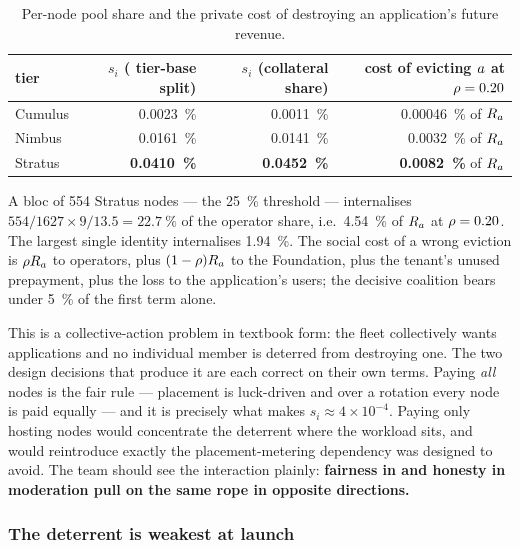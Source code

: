 \begin{table}[H]
\centering
\small
\begin{tabular}{@{}lrrr@{}}
\toprule
tier & $s_i$ (\PNR{} tier-base split) & $s_i$ (collateral share) & cost of evicting $a$ at $\rho = 0.20$ \\
\midrule
Cumulus & \SI{0.0023}{\percent} & \SI{0.0011}{\percent} & \SI{0.00046}{\percent} of $R_{a}$ \\
Nimbus  & \SI{0.0161}{\percent} & \SI{0.0141}{\percent} & \SI{0.0032}{\percent} of $R_{a}$ \\
Stratus & \textbf{\SI{0.0410}{\percent}} & \textbf{\SI{0.0452}{\percent}} & \textbf{\SI{0.0082}{\percent}} of $R_{a}$ \\
\bottomrule
\end{tabular}
\caption{Per-node pool share and the private cost of destroying an application's future revenue.}
\end{table}

A bloc of 554 Stratus nodes — the \SI{25}{\percent} threshold — internalises
$554/\num{1627} \times 9/13.5 = \SI{22.7}{\percent}$ of the operator share, i.e.\
\SI{4.54}{\percent} of $R_{a}$ at $\rho = 0.20$. The largest single identity internalises
\SI{1.94}{\percent}. The social cost of a wrong eviction is $\rho R_{a}$ to operators, plus
$(1-\rho) R_{a}$ to the Foundation, plus the tenant's unused prepayment, plus the loss to the
application's users; the decisive coalition bears under \SI{5}{\percent} of the first term alone.

This is a collective-action problem in textbook form: the fleet collectively wants applications and
no individual member is deterred from destroying one. The two design decisions that produce it are
each correct on their own terms. Paying \emph{all} nodes is the fair rule — placement is
luck-driven and over a rotation every node is paid equally — and it is precisely what makes
$s_i \approx 4 \times 10^{-4}$. Paying only hosting nodes would concentrate the deterrent where the
workload sits, and would reintroduce exactly the placement-metering dependency \PNR{} was designed
to avoid. The team should see the interaction plainly: \textbf{fairness in \PNR{} and honesty in
moderation pull on the same rope in opposite directions.}

\subsubsection{The deterrent is weakest at launch}

